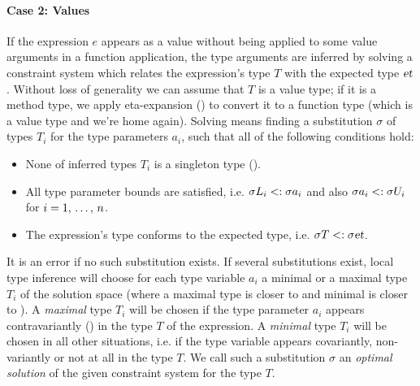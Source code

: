 \paragraph{Case 2: Values}
If the expression $e$ appears as a value without being applied to some value arguments in a function application, the type arguments are inferred by solving a constraint system which relates the expression's type $T$ with the expected type $\mbox{\sl et}$. Without loss of generality we can assume that $T$ is a value type; if it is a method type, we apply eta-expansion () to convert it to a function type (which is a value type and we're home again). Solving means finding a substitution $\sigma$ of types $T_i$ for the type parameters $a_i$, such that all of the following conditions hold:
\begin{itemize}
  \item None of inferred types $T_i$ is a singleton type (). %
  \item All type parameter bounds are satisfied, i.e. $\sigma L_i <: \sigma a_i$ and also $\sigma a_i <: \sigma U_i$ for $i = 1 ,\, \ldots ,\, n$. 
  \item The expression's type conforms to the expected type, i.e. $\sigma T <: \sigma \mbox{\sl et}$. 
\end{itemize}

It is an error if no such substitution exists. If several substitutions exist, local type inference will choose for each type variable $a_i$ a minimal or a maximal type $T_i$ of the solution space (where a maximal type is closer to  and minimal is closer to ). A {\em maximal} type $T_i$ will be chosen if the type parameter $a_i$ appears contravariantly () in the type $T$ of the expression. A {\em minimal} type $T_i$ will be chosen in all other situations, i.e. if the type variable appears covariantly, non-variantly or not at all in the type $T$. We call such a substitution $\sigma$ an {\em optimal solution} of the given constraint system for the type $T$. 


